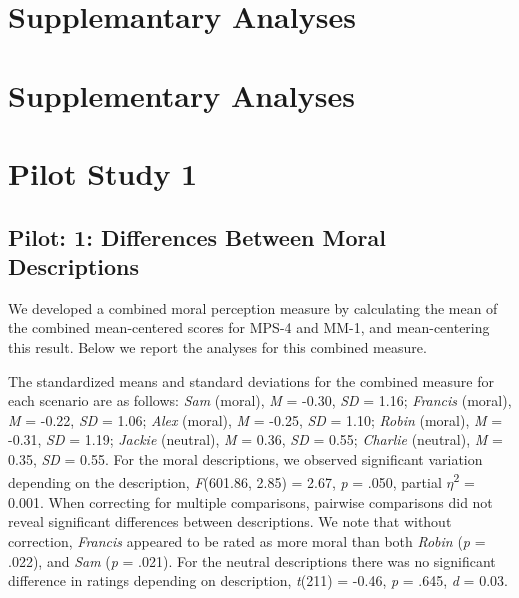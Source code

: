 \documentclass[
  american,
  man,floatsintext]{apa7}
\begin{document}
\newpage

\hypertarget{supplemantary-analyses}{%
\section{Supplemantary Analyses}\label{supplemantary-analyses}}

\newpage

\hypertarget{supplementary-analyses}{%
\section{Supplementary Analyses}\label{supplementary-analyses}}

\hypertarget{pilot-study-1}{%
\section{Pilot Study 1}\label{pilot-study-1}}

\hypertarget{pilot-1-differences-between-moral-descriptions}{%
\subsection{Pilot: 1: Differences Between Moral Descriptions}\label{pilot-1-differences-between-moral-descriptions}}

We developed a combined moral perception measure by calculating the mean of the combined mean-centered scores for MPS-4 and MM-1, and mean-centering this result. Below we report the analyses for this combined measure.

The standardized means and standard deviations for the combined measure for each scenario are as follows:
\emph{Sam} (moral),
\emph{M} = -0.30, \emph{SD} = 1.16;
\emph{Francis} (moral),
\emph{M} = -0.22, \emph{SD} = 1.06;
\emph{Alex} (moral),
\emph{M} = -0.25, \emph{SD} = 1.10;
\emph{Robin} (moral),
\emph{M} = -0.31, \emph{SD} = 1.19;
\emph{Jackie} (neutral),
\emph{M} = 0.36, \emph{SD} = 0.55;
\emph{Charlie} (neutral),
\emph{M} = 0.35, \emph{SD} = 0.55. For the moral descriptions, we observed significant variation depending on the description, \emph{F}(601.86, 2.85) = 2.67, \emph{p} = .050, partial \(\eta\)\textsuperscript{2} = 0.001. When correcting for multiple comparisons, pairwise comparisons did not reveal significant differences between descriptions. We note that without correction, \emph{Francis} appeared to be rated as more moral than both \emph{Robin} (\emph{p} = .022), and \emph{Sam} (\emph{p} = .021). For the neutral descriptions there was no significant difference in ratings depending on description, \emph{t}(211) = -0.46, \emph{p} = .645, \emph{d} = 0.03.
\end{document}

